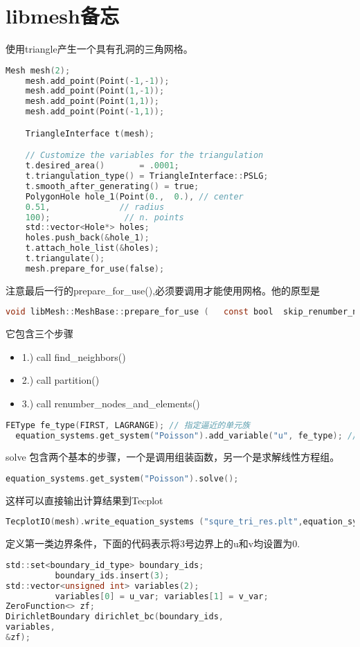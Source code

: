 \section{libmesh备忘}

使用triangle产生一个具有孔洞的三角网格。
\begin{lstlisting}[language=C]
	Mesh mesh(2);
	mesh.add_point(Point(-1,-1));
	mesh.add_point(Point(1,-1));
	mesh.add_point(Point(1,1));
	mesh.add_point(Point(-1,1));

	TriangleInterface t(mesh);

	// Customize the variables for the triangulation
	t.desired_area()       = .0001;
	t.triangulation_type() = TriangleInterface::PSLG;
	t.smooth_after_generating() = true;
	PolygonHole hole_1(Point(0.,  0.), // center
	0.51,              // radius
	100);               // n. points
	std::vector<Hole*> holes;
	holes.push_back(&hole_1);
	t.attach_hole_list(&holes);
	t.triangulate();
	mesh.prepare_for_use(false);
\end{lstlisting}
注意最后一行的prepare\_for\_use(),必须要调用才能使用网格。他的原型是
\begin{lstlisting}[language=C]
void libMesh::MeshBase::prepare_for_use	(	const bool 	skip_renumber_nodes_and_elements = true	)		
\end{lstlisting}
它包含三个步骤
\begin{itemize}
	\item 1.) call find\_neighbors()
	\item 2.) call partition() 
	\item 3.) call renumber\_nodes\_and\_elements()
\end{itemize}
\begin{lstlisting}[language=C]
	FEType fe_type(FIRST, LAGRANGE); // 指定逼近的单元族
  equation_systems.get_system("Poisson").add_variable("u", fe_type); //将逼近与变量结合起来
\end{lstlisting}
solve 包含两个基本的步骤，一个是调用组装函数，另一个是求解线性方程组。
\begin{lstlisting}[language=C]
 equation_systems.get_system("Poisson").solve();
\end{lstlisting}

这样可以直接输出计算结果到Tecplot
\begin{lstlisting}[language=C]
	TecplotIO(mesh).write_equation_systems ("squre_tri_res.plt",equation_systems);
\end{lstlisting}
定义第一类边界条件，下面的代码表示将3号边界上的u和v均设置为0.
\begin{lstlisting}[language=C]
 std::set<boundary_id_type> boundary_ids;
          boundary_ids.insert(3);
std::vector<unsigned int> variables(2);
          variables[0] = u_var; variables[1] = v_var;				
ZeroFunction<> zf;
DirichletBoundary dirichlet_bc(boundary_ids,
variables,
&zf);
\end{lstlisting}



